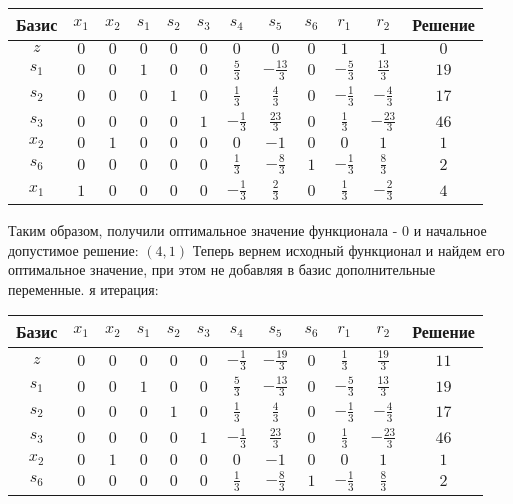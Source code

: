 \documentclass{article}%
\begin{document}
\begin{flushleft}
\begin{tabular}{|c|cccccccccc|c|}
\hline%
Базис&$x_{1}$&$x_{2}$&$s_{1}$&$s_{2}$&$s_{3}$&$s_{4}$&$s_{5}$&$s_{6}$&$r_{1}$&$r_{2}$&Решение\\%
\hline%
$z$&$0$&$0$&$0$&$0$&$0$&$0$&$0$&$0$&$1$&$1$&$0$\\%
\hline%
$s_{1}$&$0$&$0$&$1$&$0$&$0$&$\frac{5}{3}$&$-\frac{13}{3}$&$0$&$-\frac{5}{3}$&$\frac{13}{3}$&$19$\\%
$s_{2}$&$0$&$0$&$0$&$1$&$0$&$\frac{1}{3}$&$\frac{4}{3}$&$0$&$-\frac{1}{3}$&$-\frac{4}{3}$&$17$\\%
$s_{3}$&$0$&$0$&$0$&$0$&$1$&$-\frac{1}{3}$&$\frac{23}{3}$&$0$&$\frac{1}{3}$&$-\frac{23}{3}$&$46$\\%
$x_{2}$&$0$&$1$&$0$&$0$&$0$&$0$&$-1$&$0$&$0$&$1$&$1$\\%
$s_{6}$&$0$&$0$&$0$&$0$&$0$&$\frac{1}{3}$&$-\frac{8}{3}$&$1$&$-\frac{1}{3}$&$\frac{8}{3}$&$2$\\%
$x_{1}$&$1$&$0$&$0$&$0$&$0$&$-\frac{1}{3}$&$\frac{2}{3}$&$0$&$\frac{1}{3}$&$-\frac{2}{3}$&$4$\\%
\hline%
\end{tabular}%
\newline%
\newline%
Таким образом, получили оптимальное значение функционала {-} 0 и начальное допустимое решение: %
$(4, 1)$%
\newline%
Теперь вернем исходный функционал и найдем его оптимальное значение, при этом не добавляя в базис дополнительные переменные.%
я итерация: %
\newline%
\newline%
\renewcommand{\arraystretch}{1.3}%
\begin{tabular}{|c|cccccccccc|c|}%
\hline%
Базис&$x_{1}$&$x_{2}$&$s_{1}$&$s_{2}$&$s_{3}$&$s_{4}$&$s_{5}$&$s_{6}$&$r_{1}$&$r_{2}$&Решение\\%
\hline%
$z$&$0$&$0$&$0$&$0$&$0$&$-\frac{1}{3}$&$-\frac{19}{3}$&$0$&$\frac{1}{3}$&$\frac{19}{3}$&$11$\\%
\hline%
$s_{1}$&$0$&$0$&$1$&$0$&$0$&$\frac{5}{3}$&$-\frac{13}{3}$&$0$&$-\frac{5}{3}$&$\frac{13}{3}$&$19$\\%
$s_{2}$&$0$&$0$&$0$&$1$&$0$&$\frac{1}{3}$&$\frac{4}{3}$&$0$&$-\frac{1}{3}$&$-\frac{4}{3}$&$17$\\%
$s_{3}$&$0$&$0$&$0$&$0$&$1$&$-\frac{1}{3}$&$\frac{23}{3}$&$0$&$\frac{1}{3}$&$-\frac{23}{3}$&$46$\\%
$x_{2}$&$0$&$1$&$0$&$0$&$0$&$0$&$-1$&$0$&$0$&$1$&$1$\\%
$s_{6}$&$0$&$0$&$0$&$0$&$0$&$\frac{1}{3}$&$-\frac{8}{3}$&$1$&$-\frac{1}{3}$&$\frac{8}{3}$&$2$\\%

\end{tabular}
\end{flushleft}
\end{document}
